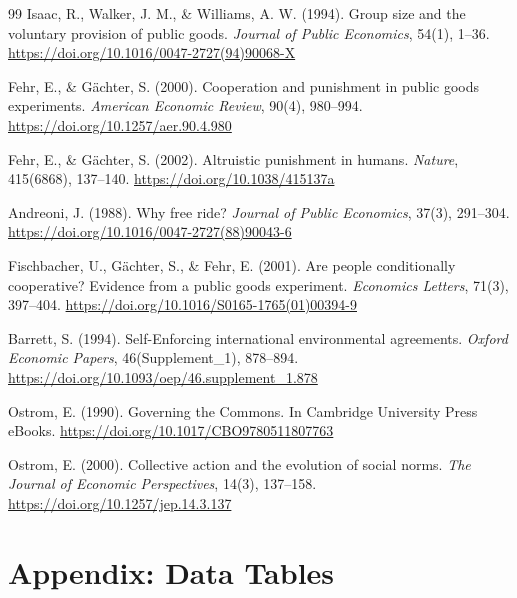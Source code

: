 \documentclass[12pt,letterpaper]{article}
\begin{document}
\begin{thebibliography}{99}
Isaac, R., Walker, J. M., \& Williams, A. W. (1994). Group size and the voluntary provision of public goods. \textit{Journal of Public Economics}, 54(1), 1--36. \url{https://doi.org/10.1016/0047-2727(94)90068-X}

Fehr, E., \& Gächter, S. (2000). Cooperation and punishment in public goods experiments. \textit{American Economic Review}, 90(4), 980--994. \url{https://doi.org/10.1257/aer.90.4.980}

Fehr, E., \& Gächter, S. (2002). Altruistic punishment in humans. \textit{Nature}, 415(6868), 137--140. \url{https://doi.org/10.1038/415137a}

Andreoni, J. (1988). Why free ride? \textit{Journal of Public Economics}, 37(3), 291--304. \url{https://doi.org/10.1016/0047-2727(88)90043-6}

Fischbacher, U., Gächter, S., \& Fehr, E. (2001). Are people conditionally cooperative? Evidence from a public goods experiment. \textit{Economics Letters}, 71(3), 397--404. \url{https://doi.org/10.1016/S0165-1765(01)00394-9}

Barrett, S. (1994). Self-Enforcing international environmental agreements. \textit{Oxford Economic Papers}, 46(Supplement\_1), 878--894. \url{https://doi.org/10.1093/oep/46.supplement_1.878}

Ostrom, E. (1990). Governing the Commons. In Cambridge University Press eBooks. \url{https://doi.org/10.1017/CBO9780511807763}

Ostrom, E. (2000). Collective action and the evolution of social norms. \textit{The Journal of Economic Perspectives}, 14(3), 137--158. \url{https://doi.org/10.1257/jep.14.3.137}

\end{thebibliography}

\clearpage
\appendix

\section{Appendix: Data Tables}
\end{document}
